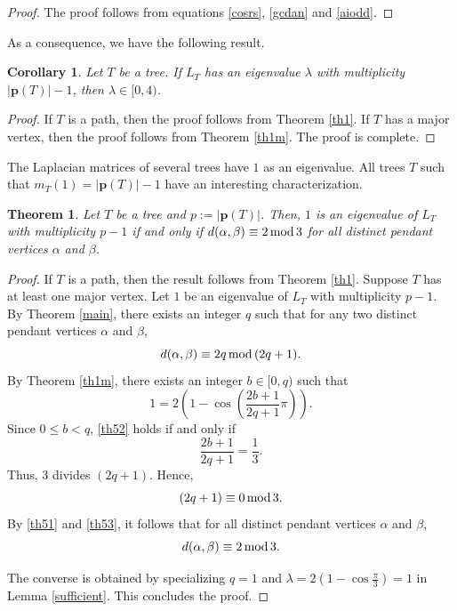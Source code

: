 \documentclass[preprint,12pt]{elsarticle}
\newcommand{\1}{\mathbf{1}}
\newcommand{\0}{\mathbf{0}}
\def\pt{\mathbf{p}}
\newtheorem{theorem}{Theorem}
\newtheorem{corollary}{Corollary}
\begin{document}
\begin{proof}
The proof follows from equations \eqref{cosrs}, \eqref{gcdan} and \eqref{aiodd}.
\end{proof}


As a consequence, we have the following result.
\begin{corollary}
 Let $T$ be a tree. If $L_T$ has an eigenvalue $\lambda$ with multiplicity $|\pt(T)|-1$, then $\lambda \in [0,4)$.   
\end{corollary}

\begin{proof}
If $T$ is a path, then the proof follows from Theorem \ref{th1}. If $T$ has a major vertex, then the proof follows from Theorem \ref{th1m}. 
The proof is complete.
\end{proof}
The Laplacian matrices of several trees have $1$ as an eigenvalue. 
All trees $T$ such that $m_{T}(1)=|\pt(T)|-1$ have an interesting characterization.



\begin{theorem}\label{cor1}
    Let $T$ be a tree and $p:=|\pt(T)|$. Then, $1$ is an eigenvalue of $L_T$ with multiplicity $p-1$ if and only if $d(\alpha,\beta) \equiv 2\,{\rm{mod}}\,3$ for all distinct pendant vertices $\alpha$ and $\beta$.
\end{theorem}
\begin{proof}
If $T$ is a path, then the result follows from Theorem \ref{th1}. Suppose $T$ has at least one major vertex. 
Let $1$ be an eigenvalue
of $L_T$ with multiplicity $p-1$. 
By Theorem \ref{main}, there exists an integer $q$ such that
for any two distinct pendant vertices $\alpha$ and $\beta$,
\begin{equation}\label{th51}
d(\alpha,\beta)\equiv 2q\,{\rm{mod}}\,(2q+1).
\end{equation}
By Theorem \ref{th1m}, there exists an integer $b \in [0,q)$ such that
\begin{equation}\label{th52}
  1=2\left( 1-\cos\left(\frac{2b+1}{2q+1}\pi \right) \right). 
\end{equation}
Since $0\leq b<q$, \eqref{th52} holds if and only if 
\[\frac{2b+1}{2q+1}=\frac{1}{3}.\] Thus, $3$ divides $(2q+1)$. Hence,
\begin{equation}\label{th53}
 (2q+1) \equiv 0\,{\rm{mod}}\,3.   
\end{equation}
By \eqref{th51} and \eqref{th53}, it follows that for all distinct pendant vertices $\alpha$ and $\beta$,  
$$d(\alpha,\beta)\equiv 2\,{\rm{mod}}\,3.$$


The converse is obtained by specializing $q=1$ 
and $\lambda=2\left(1-\cos\frac{\pi}{3}\right)=1$ in
Lemma \ref{sufficient}. This concludes the proof. 
\end{proof}
\end{document}
